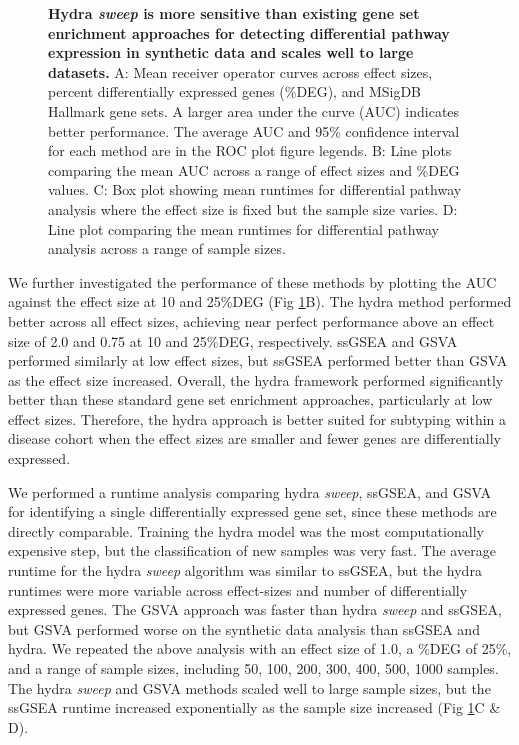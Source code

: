 \documentclass[10pt,letterpaper]{article}
\begin{document}
\begin{figure}[!h]
	\caption{{\bf Hydra \textit{sweep} is more sensitive than existing gene set enrichment approaches for detecting differential pathway expression in synthetic data and scales well to large datasets.}
		A: Mean receiver operator curves across effect sizes, percent differentially expressed genes (\%DEG), and MSigDB Hallmark gene sets. A larger area under the curve (AUC) indicates better performance. The average AUC and 95\% confidence interval for each method are in the ROC plot figure legends. B: Line plots comparing the mean AUC across a range of effect sizes and \%DEG values. C: Box plot showing mean runtimes for differential pathway analysis where the effect size is fixed but the sample size varies. D: Line plot comparing the mean runtimes for differential pathway analysis across a range of sample sizes.
		\label{rocplot}}
\end{figure}

We further investigated the performance of these methods by plotting the AUC against the effect size at 10 and 25\%DEG (Fig \ref{rocplot}B). The hydra method performed better across all effect sizes, achieving near perfect performance above an effect size of 2.0 and 0.75 at 10 and 25\%DEG, respectively. ssGSEA and GSVA performed similarly at low effect sizes, but ssGSEA performed better than GSVA as the effect size increased. Overall, the hydra framework performed significantly better than these standard gene set enrichment approaches, particularly at low effect sizes. Therefore, the hydra approach is better suited for subtyping within a disease cohort when the effect sizes are smaller and fewer genes are differentially expressed.

We performed a runtime analysis comparing hydra \textit{sweep}, ssGSEA, and GSVA for identifying a single differentially expressed gene set, since these methods are directly comparable. Training the hydra model was the most computationally expensive step, but the classification of new samples was very fast. The average runtime for the hydra \textit{sweep} algorithm was similar to ssGSEA, but the hydra runtimes were more variable across effect-sizes and number of differentially expressed genes. The GSVA approach was faster than hydra \textit{sweep} and ssGSEA, but GSVA performed worse on the synthetic data analysis than ssGSEA and hydra. We repeated the above analysis with an effect size of 1.0, a \%DEG of 25\%, and a range of sample sizes, including  50, 100, 200, 300, 400, 500, 1000 samples. The hydra \textit{sweep} and GSVA methods scaled well to large sample sizes, but the ssGSEA runtime increased exponentially as the sample size increased (Fig \ref{rocplot}C \& D).
\end{document}
